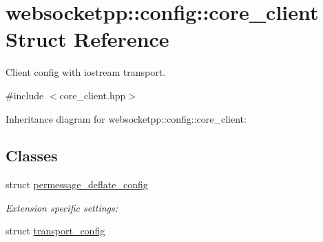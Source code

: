 \hypertarget{structwebsocketpp_1_1config_1_1core__client}{}\section{websocketpp\+:\+:config\+:\+:core\+\_\+client Struct Reference}
\label{structwebsocketpp_1_1config_1_1core__client}


Client config with iostream transport.  




{\ttfamily \#include $<$core\+\_\+client.\+hpp$>$}



Inheritance diagram for websocketpp\+:\+:config\+:\+:core\+\_\+client\+:
\subsection*{Classes}
\begin{DoxyCompactItemize}
\item 
struct \mbox{\hyperlink{structwebsocketpp_1_1config_1_1core__client_1_1permessage__deflate__config}{permessage\+\_\+deflate\+\_\+config}}
\begin{DoxyCompactList}\small\item\em Extension specific settings\+: \end{DoxyCompactList}\item 
struct \mbox{\hyperlink{structwebsocketpp_1_1config_1_1core__client_1_1transport__config}{transport\+\_\+config}}
\end{DoxyCompactItemize}
